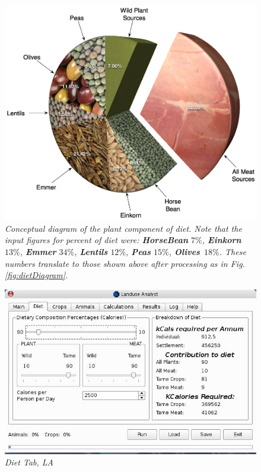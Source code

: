 \begin{figure}[htbp] %
  \includegraphics[scale=.2]{./images/dietFancyCrops.jpg}
  \caption[Plant Portion of Diet]{\label{fig:dietCropDiagram}\textit{Conceptual
    diagram of the plant component of diet.  Note that the input figures for
    percent of diet were: \textbf{HorseBean} $7\%$, \textbf{Einkorn} $13\%$,
    \textbf{Emmer} $34\%$, \textbf{Lentils} $12\%$, \textbf{Peas} $15\%$,
    \textbf{Olives}\ $18\%$.  These numbers translate to those shown above after
    processing as in Fig. \ref{fig:dietDiagram}.}}
\end{figure}

\begin{figure}[htbp] %
  \includegraphics[scale=.355]{./images/LanduseAnalystDiet545.jpg}
  \caption{\label{fig:LADiet}\textit{Diet Tab, LA}}
\end{figure}

